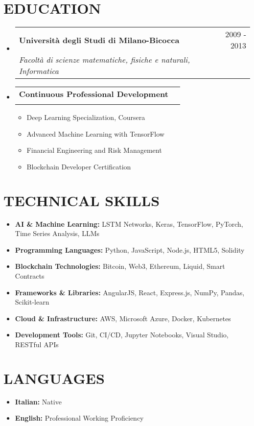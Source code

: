 \documentclass[letterpaper,11pt]{article}
\makeatletter
\newcommand{\resumeItem}[1]{
  \item\small{#1}
}
\newcommand{\resumeSubheading}[4]{
  \vspace{-2pt}\item
    \begin{tabular*}{0.97\textwidth}[t]{l@{\extracolsep{\fill}}r}
      \textbf{#1} & #2 \\
      \textit{\small#3} & \textit{\small #4} \\
    \end{tabular*}\vspace{-7pt}
}
\newcommand{\resumeSubHeadingListStart}{\begin{itemize}[leftmargin=0.15in, label={}]}
\newcommand{\resumeSubHeadingListEnd}{\end{itemize}}
\newcommand{\resumeItemListStart}{\begin{itemize}}
\newcommand{\resumeItemListEnd}{\end{itemize}\vspace{-5pt}}
\makeatother
\begin{document}
\section{EDUCATION}
\resumeSubHeadingListStart

\resumeSubheading
{Università degli Studi di Milano-Bicocca}{2009 - 2013}
{Facoltà di scienze matematiche, fisiche e naturali, Informatica}{}

\resumeSubheading
{Continuous Professional Development}{}
{}{} 
\resumeItemListStart
\resumeItem{Deep Learning Specialization, Coursera}
\resumeItem{Advanced Machine Learning with TensorFlow}
\resumeItem{Financial Engineering and Risk Management}
\resumeItem{Blockchain Developer Certification}
\resumeItemListEnd

\resumeSubHeadingListEnd

\section{TECHNICAL SKILLS}
\resumeItemListStart
\resumeItem{\textbf{AI \& Machine Learning:} LSTM Networks, Keras, TensorFlow, PyTorch, Time Series Analysis, LLMs}
\resumeItem{\textbf{Programming Languages:} Python, JavaScript, Node.js, HTML5, Solidity}
\resumeItem{\textbf{Blockchain Technologies:} Bitcoin, Web3, Ethereum, Liquid, Smart Contracts}
\resumeItem{\textbf{Frameworks \& Libraries:} AngularJS, React, Express.js, NumPy, Pandas, Scikit-learn}
\resumeItem{\textbf{Cloud \& Infrastructure:} AWS, Microsoft Azure, Docker, Kubernetes}
\resumeItem{\textbf{Development Tools:} Git, CI/CD, Jupyter Notebooks, Visual Studio, RESTful APIs}
\resumeItemListEnd

\section{LANGUAGES}
\resumeItemListStart
\resumeItem{\textbf{Italian:} Native}
\resumeItem{\textbf{English:} Professional Working Proficiency}
\resumeItemListEnd
\end{document}
